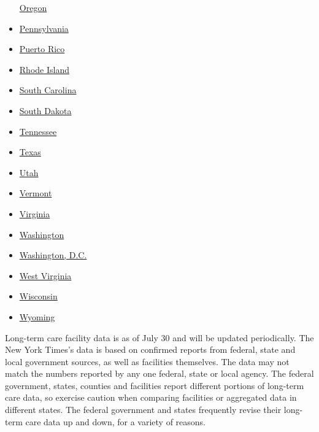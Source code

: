 \begin{itemize}
  \href{https://www.nytimes.com/interactive/2020/us/oregon-coronavirus-cases.html}{Oregon}
\item
  \href{https://www.nytimes.com/interactive/2020/us/pennsylvania-coronavirus-cases.html}{Pennsylvania}
\item
  \href{https://www.nytimes.com/interactive/2020/us/puerto-rico-coronavirus-cases.html}{Puerto
  Rico}
\item
  \href{https://www.nytimes.com/interactive/2020/us/rhode-island-coronavirus-cases.html}{Rhode
  Island}
\item
  \href{https://www.nytimes.com/interactive/2020/us/south-carolina-coronavirus-cases.html}{South
  Carolina}
\item
  \href{https://www.nytimes.com/interactive/2020/us/south-dakota-coronavirus-cases.html}{South
  Dakota}
\item
  \href{https://www.nytimes.com/interactive/2020/us/tennessee-coronavirus-cases.html}{Tennessee}
\item
  \href{https://www.nytimes.com/interactive/2020/us/texas-coronavirus-cases.html}{Texas}
\item
  \href{https://www.nytimes.com/interactive/2020/us/utah-coronavirus-cases.html}{Utah}
\item
  \href{https://www.nytimes.com/interactive/2020/us/vermont-coronavirus-cases.html}{Vermont}
\item
  \href{https://www.nytimes.com/interactive/2020/us/virginia-coronavirus-cases.html}{Virginia}
\item
  \href{https://www.nytimes.com/interactive/2020/us/washington-coronavirus-cases.html}{Washington}
\item
  \href{https://www.nytimes.com/interactive/2020/us/washington-dc-coronavirus-cases.html}{Washington,
  D.C.}
\item
  \href{https://www.nytimes.com/interactive/2020/us/west-virginia-coronavirus-cases.html}{West
  Virginia}
\item
  \href{https://www.nytimes.com/interactive/2020/us/wisconsin-coronavirus-cases.html}{Wisconsin}
\item
  \href{https://www.nytimes.com/interactive/2020/us/wyoming-coronavirus-cases.html}{Wyoming}
\end{itemize}

Long-term care facility data is as of July 30 and will be updated
periodically. The New York Times's data is based on confirmed reports
from federal, state and local government sources, as well as facilities
themselves. The data may not match the numbers reported by any one
federal, state or local agency. The federal government, states, counties
and facilities report different portions of long-term care data, so
exercise caution when comparing facilities or aggregated data in
different states. The federal government and states frequently revise
their long-term care data up and down, for a variety of reasons.

